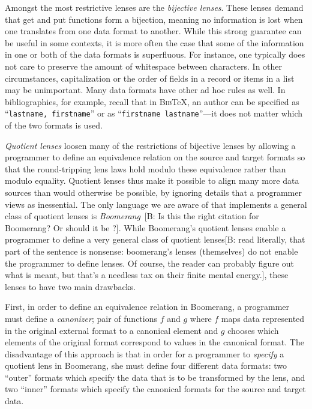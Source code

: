 \documentclass[acmsmall,review,anonymous]{acmart}
\newcommand{\FINISH}[3]{\ifdraft\textcolor{#1}{[#2: #3]}\fi}
\newcommand{\bcp}[1]{\FINISH{dkred}{B}{#1}}
\newcommand{\bibtex}{\textsc{Bib}\TeX{}}
\newcommand{\cd}[1]{\lstinline[backgroundcolor=\color{white}]$#1$}
\begin{document}
Amongst the most restrictive lenses are the \emph{bijective lenses}.  These
lenses demand that get and put functions form a bijection, meaning no
information is lost when one translates from one data format to another.  While
this strong guarantee can be useful in some contexts, it is more often the case
that some of the information in one or both of the data formats is superfluous.
For instance, one typically does not care to preserve the amount of
whitespace between characters.  In other circumstances, capitalization
or the order of fields in a record or items in a list may be unimportant. Many
data formats have other ad hoc rules as well. In bibliographies, for example,
recall that in \bibtex{}, an author can be specified as
``\cd{lastname, firstname}'' or as ``\cd{firstname lastname}''---it does not
matter which of the two formats is used.

{\em Quotient lenses} loosen many of the restrictions of bijective lenses by
allowing a programmer to define an equivalence relation on the source and
target formats so that the round-tripping lens laws hold modulo these
equivalence rather than modulo equality. Quotient lenses thus make it possible
to align many more data sources than would otherwise be possible, by ignoring
details that a programmer views as inessential. The only language we are aware
of that implements a general class of quotient lenses is {\em
Boomerang}~\cite{quotientlenses}\bcp{Is this the right citation for
Boomerang?  Or should it be \cite{boomerang}?}. While Boomerang's quotient
lenses enable a 
programmer to define a very general class of quotient lenses\bcp{read
  literally, that part of the sentence is nonsense: boomerang's lenses
  (themselves) do not enable the programmer to define lenses.  Of course,
  the reader can probably figure out what is meant, but that's a needless
  tax on their finite mental energy.}, these lenses to have two main
drawbacks. 

First, in order to define an equivalence relation in Boomerang, a programmer
must define a {\em canonizer}; pair of functions $f$ and $g$ where $f$ maps
data represented in the original external format to a canonical element and $g$
chooses which elements of the original format correspond to values in the
canonical format. The disadvantage of this approach is that in order for a
programmer to {\em specify} a quotient lens in Boomerang, she must define four
different data formats: two ``outer'' formats which specify the data that is to
be transformed by the lens, and two ``inner'' formats which specify the
canonical formats for the source and target data.
\end{document}
